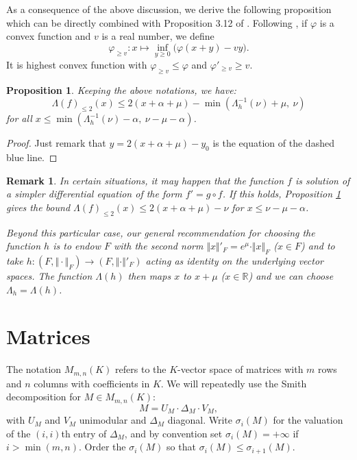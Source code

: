 \documentclass{sig-alternate}
\newtheorem{prop}[theo]{Proposition}
\newtheorem{rem}[theo]{Remark}
\newcommand{\R}{\mathbb R}
\begin{document}
As a consequence of the above discussion, we derive the following 
proposition which can be directly combined with Proposition 3.12 of 
\cite{caruso-roe-vaccon:14a}. Following \cite{caruso-roe-vaccon:14a},
if $\varphi$ is a convex function and $v$ is a real number, we define
$$\varphi_{\geq v} : x \mapsto \inf_{y \geq 0} \big( \varphi(x+y)
- vy \big).$$
It is highest convex function with $\varphi_{\geq v} \leq \varphi$ and 
$\varphi'_{\geq v} \geq v$.

\begin{prop}
\label{prop:boundLambdaf2}
Keeping the above notations, we have:
$$\Lambda(f)_{\leq 2} (x) \leq 2(x + \alpha + \mu) -
\min(\Lambda_h^{-1}(\nu) + \mu, \: \nu)$$
for all $x \leq \min(\Lambda_h^{-1}(\nu) - \alpha, \: \nu - \mu - \alpha)$.
\end{prop}

\begin{proof}
Just remark that $y = 2(x + \alpha + \mu) - y_0$ is the equation of 
the dashed blue line.
\end{proof}

\begin{rem}
In certain situations,
it may happen that the function $f$ is solution of a simpler 
differential equation of the form $f' = g \circ f$. If this holds, 
Proposition \ref{prop:boundLambdaf2} gives the bound $\Lambda(f)_{\leq 
2} (x) \leq 2(x + \alpha + \mu) - \nu$ for $x \leq \nu - \mu - \alpha$.

Beyond this particular case, our general recommendation for choosing the 
function $h$ is to endow $F$ with the second norm $\Vert x \Vert'_F = 
e^\mu \cdot \Vert x \Vert_F$ ($x \in F$) and to take $h : (F, \Vert 
\cdot \Vert_F) \to (F, \Vert \cdot \Vert'_F)$ acting as identity on the
underlying vector spaces. The function $\Lambda(h)$ then maps $x$ to $x + 
\mu$ ($x \in \R$) and we can choose $\Lambda_h = \Lambda(h)$.
\end{rem}

\section{Matrices}
\label{sec:matrices}

The notation $M_{m,n}(K)$ refers to the $K$-vector space of matrices 
with $m$ rows and $n$ columns with coefficients in $K$.  We will repeatedly
use the Smith decomposition for $M \in M_{m,n}(K)$:
\[
M = U_M \cdot \Delta_M \cdot V_M,
\]
with $U_M$ and $V_M$ unimodular and $\Delta_M$ diagonal.  Write $\sigma_i(M)$
for the valuation of the $(i,i)$th entry of $\Delta_M$, and by convention set
$\sigma_i(M) = +\infty$ if $i > \min(m,n)$.  Order the $\sigma_i(M)$ so that $\sigma_i(M) \le \sigma_{i+1}(M)$.
\end{document}
